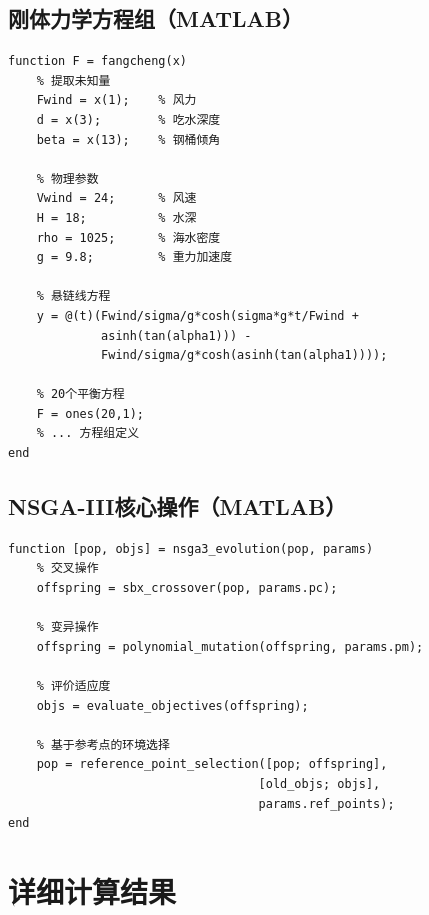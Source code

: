 \documentclass[withoutpreface,bwprint]{cumcmthesis}
\begin{document}
\begin{appendices}
\subsection{刚体力学方程组（MATLAB）}
\begin{verbatim}
function F = fangcheng(x)
    % 提取未知量
    Fwind = x(1);    % 风力
    d = x(3);        % 吃水深度
    beta = x(13);    % 钢桶倾角
    
    % 物理参数
    Vwind = 24;      % 风速
    H = 18;          % 水深
    rho = 1025;      % 海水密度
    g = 9.8;         % 重力加速度
    
    % 悬链线方程
    y = @(t)(Fwind/sigma/g*cosh(sigma*g*t/Fwind + 
             asinh(tan(alpha1))) - 
             Fwind/sigma/g*cosh(asinh(tan(alpha1))));
    
    % 20个平衡方程
    F = ones(20,1);
    % ... 方程组定义
end
\end{verbatim}

\subsection{NSGA-III核心操作（MATLAB）}
\begin{verbatim}
function [pop, objs] = nsga3_evolution(pop, params)
    % 交叉操作
    offspring = sbx_crossover(pop, params.pc);
    
    % 变异操作  
    offspring = polynomial_mutation(offspring, params.pm);
    
    % 评价适应度
    objs = evaluate_objectives(offspring);
    
    % 基于参考点的环境选择
    pop = reference_point_selection([pop; offspring], 
                                   [old_objs; objs], 
                                   params.ref_points);
end
\end{verbatim}

\section{详细计算结果}


\end{appendices}
\end{document}
